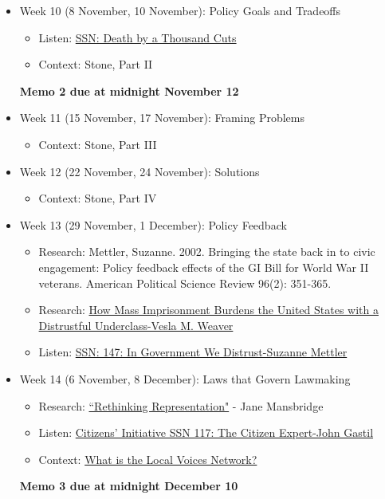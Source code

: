 \documentclass[12pt]{article}
\begin{document}
\begin{itemize}
\item Week 10 (8 November, 10 November): Policy Goals and Tradeoffs %
\begin{itemize}
\item Listen: \href{https://scholars.org/podcast/death-thousand-cuts}{SSN: Death by a Thousand Cuts}
\item Context: Stone, Part II
\end{itemize}
\textbf{Memo 2 due at midnight November 12}

\item Week 11 (15 November, 17 November): Framing Problems
\begin{itemize}
\item Context: Stone, Part III
\end{itemize}

\item Week 12 (22 November, 24 November): Solutions
\begin{itemize}
\item Context: Stone, Part IV
\end{itemize}

\item Week 13 (29 November, 1 December): Policy Feedback
\begin{itemize}
\item Research: Mettler, Suzanne. 2002. Bringing the state back in to civic engagement: Policy feedback effects of the GI Bill for World War II veterans. American Political Science Review 96(2): 351-365.
\item Research: \href{https://scholars.org/brief/how-mass-imprisonment-burdens-united-states-distrustful-civic-underclass}{How Mass Imprisonment Burdens the United States with a Distrustful Underclass-Vesla M. Weaver}
\item Listen: \href{https://scholars.org/podcast/government-we-distrust}{SSN: 147: In Government We Distrust-Suzanne Mettler}
\end{itemize}

\item Week 14 (6 November, 8 December): Laws that Govern Lawmaking
\begin{itemize}
\item Research: \href{https://canvas.wisc.edu/courses/187920/files/12580467/download}{``Rethinking Representation"} - Jane Mansbridge
\item Listen: \href{https://scholars.org/podcast/citizen-expert}{Citizens’ Initiative SSN 117: The Citizen Expert-John Gastil}
\item Context: \href{https://omny.fm/shows/madsplainers/playlists/podcast/embed?style=artwork}{What is the Local Voices Network?}
\end{itemize}
\textbf{Memo 3 due at midnight December 10}


\end{itemize}
\end{document}
